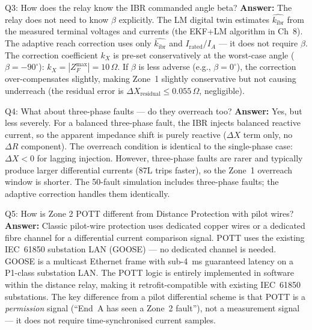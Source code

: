 \documentclass[12pt,a4paper]{article}
\newcommand{\kibr}{k_\mathrm{ibr}}
\begin{document}
\begin{keybox}{Q3: How does the relay know the IBR commanded angle beta?}
\textbf{Answer:} The relay does not need to know $\beta$ explicitly. The LM digital twin estimates $\hat{\kibr}$ from the measured terminal voltages and currents (the EKF+LM algorithm in Ch~8). The adaptive reach correction uses only $\hat{\kibr}$ and $I_\mathrm{rated}/I_A$ --- it does not require $\beta$. The correction coefficient $k_X$ is pre-set conservatively at the worst-case angle ($\beta = -90^\circ$): $k_X = |Z_F^\mathrm{max}| = 10\,\Omega$. If $\beta$ is less adverse (e.g., $\beta = 0^\circ$), the correction over-compensates slightly, making Zone~1 slightly conservative but not causing underreach (the residual error is $\Delta X_\mathrm{residual} \leq 0.055\,\Omega$, negligible).
\end{keybox}

\begin{keybox}{Q4: What about three-phase faults --- do they overreach too?}
\textbf{Answer:} Yes, but less severely. For a balanced three-phase fault, the IBR injects balanced reactive current, so the apparent impedance shift is purely reactive ($\Delta X$ term only, no $\Delta R$ component). The overreach condition is identical to the single-phase case: $\Delta X < 0$ for lagging injection. However, three-phase faults are rarer and typically produce larger differential currents (87L trips faster), so the Zone~1 overreach window is shorter. The 50-fault simulation includes three-phase faults; the adaptive correction handles them identically.
\end{keybox}

\begin{keybox}{Q5: How is Zone 2 POTT different from Distance Protection with pilot wires?}
\textbf{Answer:} Classic pilot-wire protection uses dedicated copper wires or a dedicated fibre channel for a differential current comparison signal. POTT uses the existing IEC~61850 substation LAN (GOOSE) --- no dedicated channel is needed. GOOSE is a multicast Ethernet frame with sub-4~ms guaranteed latency on a P1-class substation LAN. The POTT logic is entirely implemented in software within the distance relay, making it retrofit-compatible with existing IEC~61850 substations. The key difference from a pilot differential scheme is that POTT is a \emph{permission} signal (``End~A has seen a Zone~2 fault''), not a measurement signal --- it does not require time-synchronised current samples.
\end{keybox}
\end{document}
